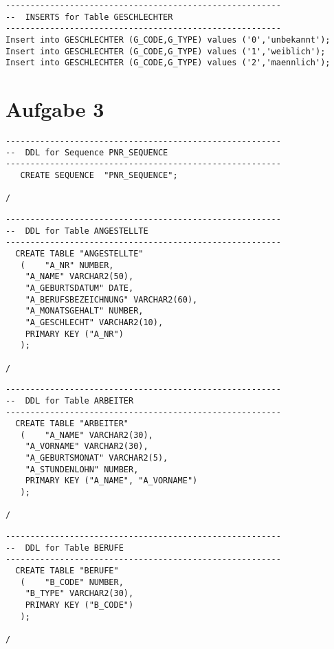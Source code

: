 \documentclass{scrartcl}
\begin{document}
\begin{lstlisting}
--------------------------------------------------------
--  INSERTS for Table GESCHLECHTER
--------------------------------------------------------
Insert into GESCHLECHTER (G_CODE,G_TYPE) values ('0','unbekannt');
Insert into GESCHLECHTER (G_CODE,G_TYPE) values ('1','weiblich');
Insert into GESCHLECHTER (G_CODE,G_TYPE) values ('2','maennlich');
\end{lstlisting}

\newpage

\section*{Aufgabe 3}
\begin{lstlisting}
--------------------------------------------------------
--  DDL for Sequence PNR_SEQUENCE
--------------------------------------------------------
   CREATE SEQUENCE  "PNR_SEQUENCE";

/
\end{lstlisting}

\begin{lstlisting}
--------------------------------------------------------
--  DDL for Table ANGESTELLTE
--------------------------------------------------------
  CREATE TABLE "ANGESTELLTE" 
   (	"A_NR" NUMBER, 
	"A_NAME" VARCHAR2(50), 
	"A_GEBURTSDATUM" DATE, 
	"A_BERUFSBEZEICHNUNG" VARCHAR2(60), 
	"A_MONATSGEHALT" NUMBER, 
	"A_GESCHLECHT" VARCHAR2(10),
	PRIMARY KEY ("A_NR")
   );

/
\end{lstlisting}

\begin{lstlisting}
--------------------------------------------------------
--  DDL for Table ARBEITER
--------------------------------------------------------
  CREATE TABLE "ARBEITER" 
   (	"A_NAME" VARCHAR2(30), 
	"A_VORNAME" VARCHAR2(30), 
	"A_GEBURTSMONAT" VARCHAR2(5), 
	"A_STUNDENLOHN" NUMBER,
	PRIMARY KEY ("A_NAME", "A_VORNAME")
   );

/

\end{lstlisting}

\begin{lstlisting}
--------------------------------------------------------
--  DDL for Table BERUFE
--------------------------------------------------------
  CREATE TABLE "BERUFE" 
   (	"B_CODE" NUMBER, 
	"B_TYPE" VARCHAR2(30),
	PRIMARY KEY ("B_CODE")
   );

/
\end{lstlisting}
\end{document}
